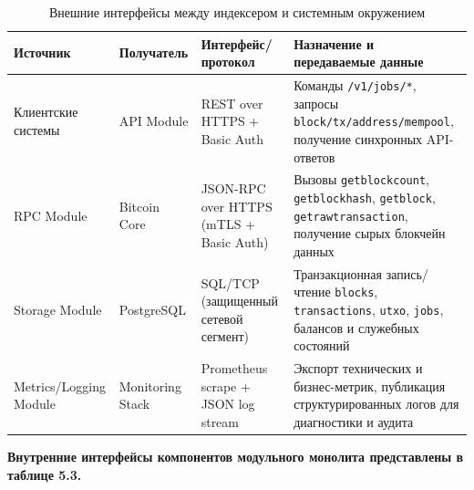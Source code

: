 ﻿\documentclass[14pt,a4paper]{extarticle}
\begin{document}
\begin{table}[H]
\centering
\begin{tabular}{p{} p{} p{} p{}}
\toprule
Источник & Получатель & Интерфейс/протокол & Назначение и передаваемые данные \\
\midrule
Клиентские системы & API Module & REST over HTTPS + Basic Auth & Команды \texttt{/v1/jobs/*}, запросы \texttt{block/tx/address/mempool}, получение синхронных API-ответов \\
\midrule
RPC Module & Bitcoin Core & JSON-RPC over HTTPS (mTLS + Basic Auth) & Вызовы \texttt{getblockcount}, \texttt{getblockhash}, \texttt{getblock}, \texttt{getrawtransaction}, получение сырых блокчейн данных \\
\midrule
Storage Module & PostgreSQL & SQL/TCP (защищенный сетевой сегмент) & Транзакционная запись/чтение \texttt{blocks}, \texttt{transactions}, \texttt{utxo}, \texttt{jobs}, балансов и служебных состояний \\
\midrule
Metrics/Logging Module & Monitoring Stack & Prometheus scrape + JSON log stream & Экспорт технических и бизнес-метрик, публикация структурированных логов для диагностики и аудита \\
\bottomrule
\end{tabular}
\caption{Внешние интерфейсы между индексером и системным окружением}
\end{table}

\textbf{Внутренние интерфейсы компонентов модульного монолита представлены в таблице 5.3.}
\end{document}
